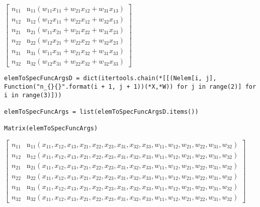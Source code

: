 \documentclass[
]{article}
\begin{document}
\(\displaystyle \left[\begin{matrix}n_{11} & \operatorname{n_{11}}{\left(w_{11} x_{11} + w_{21} x_{12} + w_{31} x_{13} \right)}\\n_{12} & \operatorname{n_{12}}{\left(w_{12} x_{11} + w_{22} x_{12} + w_{32} x_{13} \right)}\\n_{21} & \operatorname{n_{21}}{\left(w_{11} x_{21} + w_{21} x_{22} + w_{31} x_{23} \right)}\\n_{22} & \operatorname{n_{22}}{\left(w_{12} x_{21} + w_{22} x_{22} + w_{32} x_{23} \right)}\\n_{31} & \operatorname{n_{31}}{\left(w_{11} x_{31} + w_{21} x_{32} + w_{31} x_{33} \right)}\\n_{32} & \operatorname{n_{32}}{\left(w_{12} x_{31} + w_{22} x_{32} + w_{32} x_{33} \right)}\end{matrix}\right]\)

\begin{verbatim}
elemToSpecFuncArgsD = dict(itertools.chain(*[[(Nelem[i, j], Function("n_{}{}".format(i + 1, j + 1))(*X,*W)) for j in range(2)] for i in range(3)]))

elemToSpecFuncArgs = list(elemToSpecFuncArgsD.items())

Matrix(elemToSpecFuncArgs)
\end{verbatim}

\(\displaystyle \left[\begin{matrix}n_{11} & \operatorname{n_{11}}{\left(x_{11},x_{12},x_{13},x_{21},x_{22},x_{23},x_{31},x_{32},x_{33},w_{11},w_{12},w_{21},w_{22},w_{31},w_{32} \right)}\\n_{12} & \operatorname{n_{12}}{\left(x_{11},x_{12},x_{13},x_{21},x_{22},x_{23},x_{31},x_{32},x_{33},w_{11},w_{12},w_{21},w_{22},w_{31},w_{32} \right)}\\n_{21} & \operatorname{n_{21}}{\left(x_{11},x_{12},x_{13},x_{21},x_{22},x_{23},x_{31},x_{32},x_{33},w_{11},w_{12},w_{21},w_{22},w_{31},w_{32} \right)}\\n_{22} & \operatorname{n_{22}}{\left(x_{11},x_{12},x_{13},x_{21},x_{22},x_{23},x_{31},x_{32},x_{33},w_{11},w_{12},w_{21},w_{22},w_{31},w_{32} \right)}\\n_{31} & \operatorname{n_{31}}{\left(x_{11},x_{12},x_{13},x_{21},x_{22},x_{23},x_{31},x_{32},x_{33},w_{11},w_{12},w_{21},w_{22},w_{31},w_{32} \right)}\\n_{32} & \operatorname{n_{32}}{\left(x_{11},x_{12},x_{13},x_{21},x_{22},x_{23},x_{31},x_{32},x_{33},w_{11},w_{12},w_{21},w_{22},w_{31},w_{32} \right)}\end{matrix}\right]\)
\end{document}
